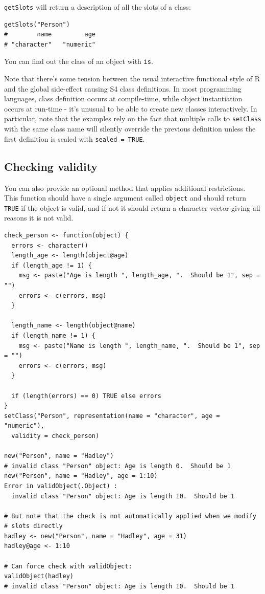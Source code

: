 \texttt{getSlots} will return a description of all the slots of a class:

\begin{verbatim}
getSlots("Person")
#        name         age 
# "character"   "numeric" 
\end{verbatim}

You can find out the class of an object with \texttt{is}.

Note that there's some tension between the usual interactive functional
style of R and the global side-effect causing S4 class definitions. In
most programming languages, class definition occurs at compile-time,
while object instantiation occurs at run-time - it's unusual to be able
to create new classes interactively. In particular, note that the
examples rely on the fact that multiple calls to \texttt{setClass} with
the same class name will silently override the previous definition
unless the first definition is sealed with \texttt{sealed = TRUE}.

\subsection{Checking validity}

You can also provide an optional method that applies additional
restrictions. This function should have a single argument called
\texttt{object} and should return \texttt{TRUE} if the object is valid,
and if not it should return a character vector giving all reasons it is
not valid.

\begin{verbatim}
check_person <- function(object) {
  errors <- character()
  length_age <- length(object@age)
  if (length_age != 1) {
    msg <- paste("Age is length ", length_age, ".  Should be 1", sep = "")
    errors <- c(errors, msg)
  }

  length_name <- length(object@name)
  if (length_name != 1) {
    msg <- paste("Name is length ", length_name, ".  Should be 1", sep = "")
    errors <- c(errors, msg)
  }
  
  if (length(errors) == 0) TRUE else errors
}
setClass("Person", representation(name = "character", age = "numeric"), 
  validity = check_person)

new("Person", name = "Hadley")
# invalid class "Person" object: Age is length 0.  Should be 1
new("Person", name = "Hadley", age = 1:10)
Error in validObject(.Object) : 
  invalid class "Person" object: Age is length 10.  Should be 1
  
# But note that the check is not automatically applied when we modify 
# slots directly
hadley <- new("Person", name = "Hadley", age = 31)
hadley@age <- 1:10

# Can force check with validObject:
validObject(hadley)
# invalid class "Person" object: Age is length 10.  Should be 1
\end{verbatim}

